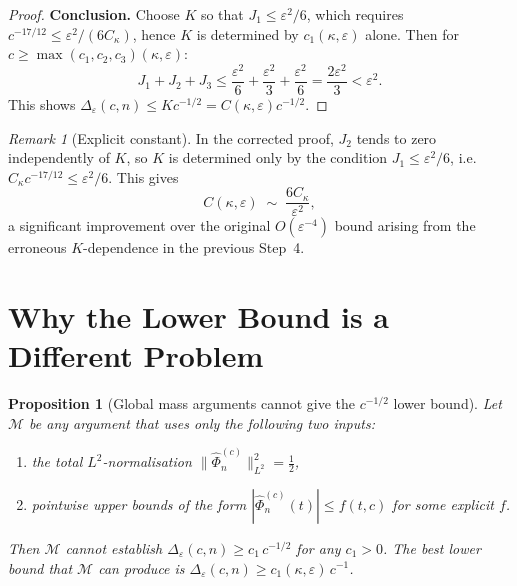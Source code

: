 \documentclass[12pt,a4paper]{amsart}
\newtheorem{proposition}[theorem]{Proposition}
\theoremstyle{definition}
\theoremstyle{remark}
\newtheorem{remark}[theorem]{Remark}
\begin{document}
\begin{proof}
\textbf{Conclusion.}
Choose $K$ so that $J_1 \le \varepsilon^2/6$,
which requires $c^{-17/12} \le \varepsilon^2/(6C_\kappa)$,
hence $K$ is determined by $c_1(\kappa,\varepsilon)$ alone.
Then for $c \ge \max(c_1,c_2,c_3)(\kappa,\varepsilon)$:
\[
J_1 + J_2 + J_3
\le \frac{\varepsilon^2}{6} + \frac{\varepsilon^2}{3}
+ \frac{\varepsilon^2}{6}
= \frac{2\varepsilon^2}{3} < \varepsilon^2.
\]
This shows $\Delta_\varepsilon(c,n) \le Kc^{-1/2}
= C(\kappa,\varepsilon) c^{-1/2}$.
\end{proof}

\begin{remark}[Explicit constant]
\label{rem:explicit-const}
In the corrected proof, $J_2$ tends to zero
independently of $K$, so $K$ is determined
only by the condition $J_1 \le \varepsilon^2/6$,
i.e.\ $C_\kappa c^{-17/12} \le \varepsilon^2/6$.
This gives
\[
C(\kappa,\varepsilon)
\;\sim\; \frac{6C_\kappa}{\varepsilon^2},
\]
a significant improvement over the original
$O(\varepsilon^{-4})$ bound arising from the
erroneous $K$-dependence in the previous Step~4.
\end{remark}

\section{Why the Lower Bound is a Different Problem}
\label{sec:barrier}

\begin{proposition}[Global mass arguments
cannot give the $c^{-1/2}$ lower bound]
\label{prop:lower-barrier}
Let $\mathcal{M}$ be any argument that uses
only the following two inputs:
\begin{enumerate}[\rm(a)]
\item the total $L^2$-normalisation
$\|\widehat{\Phi}_n^{(c)}\|_{L^2}^2
= \tfrac{1}{2}$,
\item pointwise upper bounds of the form
$|\widehat{\Phi}_n^{(c)}(t)|
\le f(t,c)$ for some explicit $f$.
\end{enumerate}
Then $\mathcal{M}$ cannot establish
$\Delta_\varepsilon(c,n) \ge c_1\,c^{-1/2}$
for any $c_1 > 0$.
The best lower bound that $\mathcal{M}$
can produce is
$\Delta_\varepsilon(c,n) \ge c_1({\kappa,\varepsilon})\,c^{-1}$.
\end{proposition}
\end{document}
